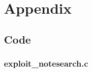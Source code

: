 \documentclass[11pt, a4paper]{article}
\begin{document}
\appendix
\newpage
\renewcommand{\thesubsection}{\Alph{subsection}}
\pagebreak

\section{Appendix}
\subsection{Code}
\subsubsection{exploit\_notesearch.c}
\label{exploit_notesearch.c}




\newpage
\printbibliography
\listoffigures
\listoftables
\printglossaries
\end{document}
